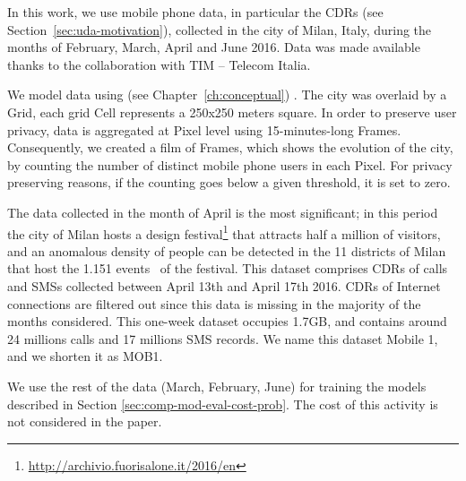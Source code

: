 {%

In this work, we use mobile phone data, in particular the CDRs (see Section~\ref{sec:uda-motivation}), collected in the city of Milan, Italy, during the months of February, March, April and June 2016. Data was made available thanks to the collaboration with TIM -- Telecom Italia.

We model data using \frappe{} (see Chapter~\ref{ch:conceptual}) .
The city was overlaid by a \textsf{Grid}, each grid \textsf{Cell} represents a 250x250 meters square. 
In order to preserve user privacy, data is aggregated at \textsf{Pixel} level using 15-minutes-long \textsf{Frame}s.
Consequently, we created a film of \textsf{Frame}s, which shows the evolution of the city, by counting the number of distinct mobile phone users in each \textsf{Pixel}. For privacy preserving reasons, if the counting goes below a given threshold, it is set to zero.

The data collected in the month of April is the most significant; in this period the city of Milan hosts a design festival\footnote{\url{http://archivio.fuorisalone.it/2016/en}} that attracts half a million of visitors, and an anomalous density of people can be detected in the 11 districts of Milan that host the 1.151 events~\cite{DBLP:journals/ieeemm/BalduiniVALAC15} of the festival. This dataset comprises CDRs of calls and SMSs collected between April 13th and April 17th 2016. CDRs of Internet connections are filtered out since this data is missing in the majority of the months considered. This one-week dataset occupies 1.7GB, and contains around 24 millions calls and 17 millions SMS records. We name this dataset Mobile 1, and we shorten it as MOB1. 

We use the rest of the data (March, February, June) for training the models described in Section \ref{sec:comp-mod-eval-cost-prob}. The cost of this activity is not considered in the paper.

}
